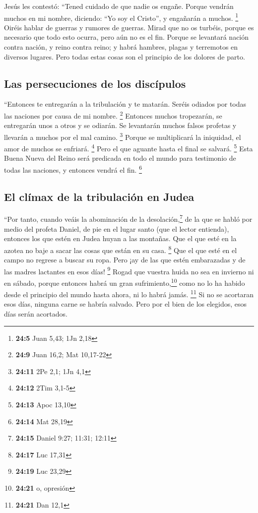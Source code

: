  Jesús les contestó: ``Tened cuidado de que nadie os
engañe.  Porque vendrán muchos en mi nombre, diciendo:
``Yo soy el Cristo'', y engañarán a muchos. \footnote{\textbf{24:5} Juan
  5,43; 1Jn 2,18}  Oiréis hablar de guerras y rumores de
guerras. Mirad que no os turbéis, porque es necesario que todo esto
ocurra, pero aún no es el fin.  Porque se levantará nación
contra nación, y reino contra reino; y habrá hambres, plagas y
terremotos en diversos lugares.  Pero todas estas cosas
son el principio de los dolores de parto.

\hypertarget{las-persecuciones-de-los-discuxedpulos}{%
\subsection{Las persecuciones de los
discípulos}\label{las-persecuciones-de-los-discuxedpulos}}

 ``Entonces te entregarán a la tribulación y te matarán.
Seréis odiados por todas las naciones por causa de mi nombre.
\footnote{\textbf{24:9} Juan 16,2; Mat 10,17-22} 
Entonces muchos tropezarán, se entregarán unos a otros y se odiarán.
 Se levantarán muchos falsos profetas y llevarán a muchos
por el mal camino. \footnote{\textbf{24:11} 2Pe 2,1; 1Jn 4,1}
 Porque se multiplicará la iniquidad, el amor de muchos
se enfriará. \footnote{\textbf{24:12} 2Tim 3,1-5}  Pero
el que aguante hasta el final se salvará. \footnote{\textbf{24:13} Apoc
  13,10}  Esta Buena Nueva del Reino será predicada en
todo el mundo para testimonio de todas las naciones, y entonces vendrá
el fin. \footnote{\textbf{24:14} Mat 28,19}

\hypertarget{el-cluxedmax-de-la-tribulaciuxf3n-en-judea}{%
\subsection{El clímax de la tribulación en
Judea}\label{el-cluxedmax-de-la-tribulaciuxf3n-en-judea}}

 ``Por tanto, cuando veáis la abominación de la
desolación,\footnote{\textbf{24:15} Daniel 9:27; 11:31; 12:11} de la que
se habló por medio del profeta Daniel, de pie en el lugar santo (que el
lector entienda),  entonces los que estén en Judea huyan
a las montañas.  Que el que esté en la azotea no baje a
sacar las cosas que están en su casa. \footnote{\textbf{24:17} Luc 17,31}
 Que el que esté en el campo no regrese a buscar su ropa.
 Pero ¡ay de las que estén embarazadas y de las madres
lactantes en esos días! \footnote{\textbf{24:19} Luc 23,29}
 Rogad que vuestra huida no sea en invierno ni en sábado,
 porque entonces habrá un gran sufrimiento,\footnote{\textbf{24:21}
  o, opresión} como no lo ha habido desde el principio del mundo hasta
ahora, ni lo habrá jamás. \footnote{\textbf{24:21} Dan 12,1}
 Si no se acortaran esos días, ninguna carne se habría
salvado. Pero por el bien de los elegidos, esos días serán acortados.

